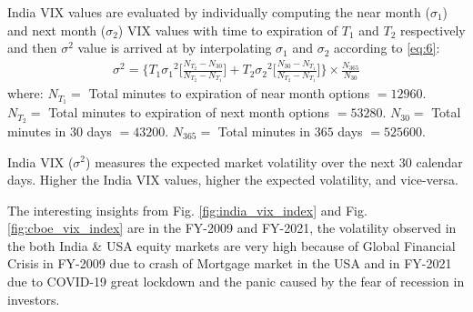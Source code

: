 \documentclass[conference]{IEEEtran}
\begin{document}
    India VIX values are evaluated by individually computing the near month ($\sigma_{1}$) and next month ($\sigma_{2}$) VIX values with time to expiration of $T_{1}$ and $T_{2}$ respectively and then ${\sigma}^{2}$ value is arrived at by interpolating $\sigma_{1}$ and $\sigma_{2}$ according to \ref{eq:6}:
    \begin{align}
        {\sigma}^{2} = \Big\{T_{1}{\sigma_{1}}^{2}\Big[\frac{N_{T_{2}} - N_{30}}{N_{T_{2}} - N_{T_{1}}}\Big] + T_{2}{\sigma_{2}}^{2}\Big[\frac{N_{30} - N_{T_{1}}}{N_{T_{2}} - N_{T_{1}}}\Big]\Big\} \times \frac{N_{365}}{N_{30}} \label{eq:6}
    \end{align}
where: \newline
    $N_{T_{1}} =$ Total minutes to expiration of near month options $= 12960$. \newline
    $N_{T_{2}} =$ Total minutes to expiration of next month options $= 53280$. \newline
    $N_{30} =$ Total minutes in $30$ days $= 43200$. \newline
    $N_{365} =$ Total minutes in $365$ days $= 525600$. \newline
    
India VIX ($\sigma^{2}$) measures the expected market volatility over the next $30$ calendar days. Higher the India VIX values, higher the expected volatility, and vice-versa.



The interesting insights from Fig. \ref{fig:india_vix_index} and Fig. \ref{fig:cboe_vix_index} are in the FY-2009 and FY-2021, the volatility observed in the both India \& USA equity markets are very high because of Global Financial Crisis in FY-2009 due to crash of Mortgage market in the USA and in FY-2021 due to COVID-19 great lockdown and the panic caused by the fear of recession in investors.
\end{document}

